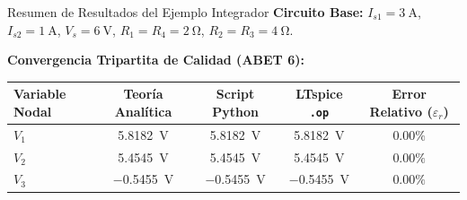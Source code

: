 \documentclass[aspectratio=169, 10pt]{beamer}
\begin{document}
\begin{frame}{Resumen de Resultados del Ejemplo Integrador}
    \textbf{Circuito Base:} $I_{s1} = \qty{3}{\ampere}$, $I_{s2} = \qty{1}{\ampere}$, $V_s = \qty{6}{\volt}$, $R_1=R_4=\qty{2}{\ohm}$, $R_2=R_3=\qty{4}{\ohm}$.
    
    \vspace{0.4cm}
    \textbf{Convergencia Tripartita de Calidad (ABET 6):}
    \begin{table}[]
        \centering
        \renewcommand{\arraystretch}{1.4}
        \begin{tabular}{@{}l c c c c@{}}
            \toprule
            \rowcolor{ucbblue!10}
            \textbf{Variable Nodal} & \textbf{Teoría Analítica} & \textbf{Script Python} & \textbf{LTspice \texttt{.op}} & \textbf{Error Relativo ($\varepsilon_r$)} \\
            \midrule
            $V_1$ & \qty{5.8182}{\volt} & \qty{5.8182}{\volt} & \qty{5.8182}{\volt} & $0.00\%$ \\
            $V_2$ & \qty{5.4545}{\volt} & \qty{5.4545}{\volt} & \qty{5.4545}{\volt} & $0.00\%$ \\
            $V_3$ & \qty{-0.5455}{\volt} & \qty{-0.5455}{\volt} & \qty{-0.5455}{\volt} & $0.00\%$ \\
            \bottomrule
        \end{tabular}
    \end{table}
\end{frame}
\end{document}
